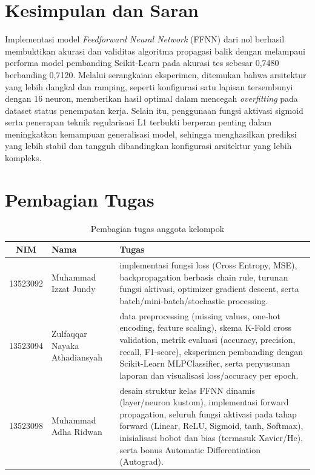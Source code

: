 

\begin{titlepage}
  \thispagestyle{firstpage}
  \maketitle
\end{titlepage}

\tableofcontents
\pagebreak

\newpage


\section{Kesimpulan dan Saran}
Implementasi model \textit{Feedforward Neural Network} (FFNN) dari nol berhasil membuktikan akurasi dan validitas algoritma propagasi balik dengan melampaui performa model pembanding Scikit-Learn pada akurasi tes sebesar 0,7480 berbanding 0,7120. Melalui serangkaian eksperimen, ditemukan bahwa arsitektur yang lebih dangkal dan ramping, seperti konfigurasi satu lapisan tersembunyi dengan 16 neuron, memberikan hasil optimal dalam mencegah \textit{overfitting} pada dataset status penempatan kerja. Selain itu, penggunaan fungsi aktivasi sigmoid serta penerapan teknik regularisasi L1 terbukti berperan penting dalam meningkatkan kemampuan generalisasi model, sehingga menghasilkan prediksi yang lebih stabil dan tangguh dibandingkan konfigurasi arsitektur yang lebih kompleks.

\section{Pembagian Tugas}

\begin{table}[H]
\centering
\caption{Pembagian tugas anggota kelompok}
\begin{tabular}{clp{9cm}}
\toprule
\textbf{NIM} & \textbf{Nama} & \textbf{Tugas} \\
\midrule
13523092 & Muhammad Izzat Jundy          & implementasi fungsi loss (Cross Entropy, MSE), backpropagation berbasis chain rule, turunan fungsi aktivasi, optimizer gradient descent, serta batch/mini-batch/stochastic processing. \\
13523094 & Zulfaqqar Nayaka Athadiansyah & data preprocessing (missing values, one-hot encoding, feature scaling), skema K-Fold cross validation, metrik evaluasi (accuracy, precision, recall, F1-score), eksperimen pembanding dengan Scikit-Learn MLPClassifier, serta penyusunan laporan dan visualisasi loss/accuracy per epoch.\\
13523098 & Muhammad Adha Ridwan          & desain struktur kelas FFNN dinamis (layer/neuron kustom), implementasi forward propagation, seluruh fungsi aktivasi pada tahap forward (Linear, ReLU, Sigmoid, tanh, Softmax), inisialisasi bobot dan bias (termasuk Xavier/He), serta bonus Automatic Differentiation (Autograd).\\
\bottomrule
\end{tabular}
\end{table}

